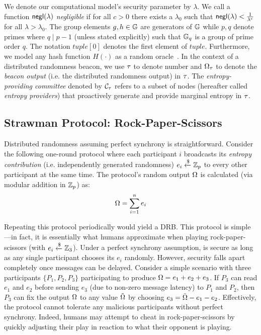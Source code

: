 We denote our computational model's security parameter by $\lambda$. We call a function $\mathsf{negl}(\lambda)$ \textit{negligible} if for all $c > 0$ there exists a $\lambda_0$ such that $\mathsf{negl}(\lambda) < \frac{1}{\lambda^c}$ for all $\lambda > \lambda_0$. The group elements $g, h \in \mathbb{G}$ are generators of $\mathbb{G}$ while $p, q$ denote primes where $q \mid p - 1$ (unless stated explicitly) such that $\mathbb{G}_q$ is a group of prime order $q$. The notation $tuple[0]$ denotes the first element of $tuple$. Furthermore, we model any hash function $H(\cdot)$ as a random oracle~\cite{bellare1993random}.
In the context of a distributed randomness beacon, we use $\tau$ to denote \epoch number and $\Omega_\tau$ to denote the \textit{beacon output} (i.e. the distributed randomness output) in \epoch $\tau$. The \textit{entropy-providing committee} denoted by $\mathcal{C}_\tau$ refers to a subset of nodes (hereafter called \textit{entropy providers}) that proactively generate and provide marginal entropy in \epoch $\tau$. %

\subsection{Strawman Protocol: Rock-Paper-Scissors}
Distributed randomness assuming perfect synchrony is straightforward. Consider the following one-round protocol where each participant $i$ broadcasts its \textit{entropy contribution} (i.e. independently generated randomness) $e_i \xleftarrow{\$} \mathbb{Z}_p$ to every other participant at the same time. The protocol's random output $\Omega$ is calculated (via modular addition in $\mathbb{Z}_p$) as:
\begin{equation}
\label{equation:addall}
\drboutput = \sum_{i = 1}^n e_i
\end{equation}

Repeating this protocol periodically would yield a DRB.
This protocol is simple---in fact, it is essentially what humans approximate when playing rock-paper-scissors (with $e_i \xleftarrow{\$} \mathbb{Z}_3$).
Under a perfect synchrony assumption, is secure as long as any single participant chooses its $e_i$ randomly. However, security falls apart completely once messages can be delayed.
Consider a simple scenario with three participants $\{P_1, P_2, P_3\}$ participating to produce $\Omega = e_1 + e_2 + e_3$. If $P_3$ can read $e_1$ and $e_2$ before sending $e_3$ (due to non-zero message latency) to $P_1$ and $P_2$, then $P_3$ can fix the output $\Omega$ to any value $\tilde{\Omega}$ by choosing $e_3 = \tilde{\Omega} - e_1 - e_2$. Effectively, the protocol cannot tolerate any malicious participants without perfect synchrony.
Indeed, humans may attempt to cheat in rock-paper-scissors by quickly adjusting their play in reaction to what their opponent is playing.

